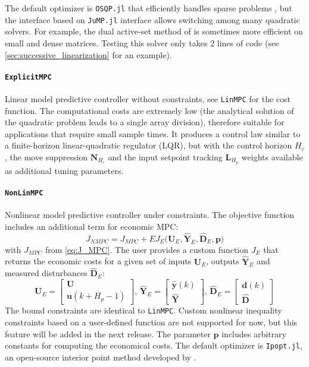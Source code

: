 The default optimizer is \texttt{OSQP.jl} that efficiently handles sparse problems \citep{osqp}, but the interface based on \texttt{JuMP.jl} interface allows switching among many quadratic solvers. For example, the dual active-set method of \citet{daqp} is sometimes more efficient on small and dense matrices. Testing this solver only takes 2 lines of code (see \cref{sec:successive_linearization} for an example).

\paragraph{\textnormal{\texttt{ExplicitMPC}}}
Linear model predictive controller without constraints, see \texttt{LinMPC} for the cost function. The computational costs are extremely low (the analytical solution of the quadratic problem leads to a single array division), therefore suitable for applications that require small sample times. It produces a control law similar to a finite-horizon linear-quadratic regulator (LQR), but with the control horizon $H_c$, the move suppression $\mathbf{N}_{H_c}$ and the input setpoint tracking $\mathbf{L}_{H_p}$ weights available as additional tuning parameters.

\paragraph{\textnormal{\texttt{NonLinMPC}}}
Nonlinear model predictive controller under constraints. The objective function includes an additional term for economic MPC:
\begin{equation}\label{eq:J_NMPC}
J_{\mathit{NMPC}} = J_{\mathit{MPC}} 
    + E J_E\big(\mathbf{U}_E, \mathbf{\hat{Y}}_E, \mathbf{\hat{D}}_E, \mathbf{p}\big)
\end{equation}
with $J_{\mathit{MPC}}$ from \eqref{eq:J_MPC}. The user provides a custom function $J_E$ that returns the economic costs for a given set of inputs $\mathbf{U}_E$, outputs $\mathbf{\hat{Y}}_E$ and measured disturbances $\mathbf{\hat{D}}_E$:
\begin{equation}
\mathbf{U}_E = 
\begin{bmatrix}
    \mathbf{U} \\ \mathbf{u}(k+H_p-1)
\end{bmatrix}\!,\,
\mathbf{\hat{Y}}_E = 
\begin{bmatrix}
    \mathbf{\hat{y}}(k) \\ \mathbf{\hat{Y}}
\end{bmatrix}\!,\, 
\mathbf{\hat{D}}_E = 
\begin{bmatrix}
    \mathbf{d}(k) \\ \mathbf{\hat{D}}
\end{bmatrix} 
\end{equation} 
The bound constraints are identical to \texttt{LinMPC}. Custom nonlinear inequality constraints based on a user-defined function are not supported for now, but this feature will be added in the next release. The parameter $\mathbf{p}$ includes arbitrary constants for computing the economical costs. The default optimizer is \texttt{Ipopt.jl}, an open-source interior point method developed by \citet{ipopt}.
